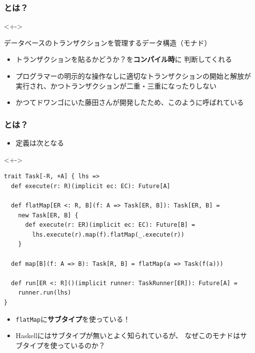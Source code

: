 \begin{frame}
  \frametitle{\Fujitask とは？}

  \pause
  \begin{uncoverenv}<+->
    \begin{block}{\Fujitask}
      データベースのトランザクションを管理するデータ構造（モナド）
    \end{block}
  \end{uncoverenv}

  \begin{itemize}
    \item<+-> トランザクションを貼るかどうか？を\textbf{コンパイル時}に
    判断してくれる

    \item<+-> プログラマーの明示的な操作なしに適切なトランザクションの開始と解放が
    実行され、かつトランザクションが二重・三重になったりしない

    \item<+-> かつてドワンゴにいた藤田さんが開発したため、このように呼ばれている
  \end{itemize}
\end{frame}

\begin{frame}[fragile]
  \frametitle{\Fujitask とは？}

  \begin{itemize}
    \item<+-> 定義は次となる
  \end{itemize}

  \begin{uncoverenv}<+->
\begin{lstlisting}[style=scala]
trait Task[-R, +A] { lhs =>
  def execute(r: R)(implicit ec: EC): Future[A]

  def flatMap[ER <: R, B](f: A => Task[ER, B]): Task[ER, B] =
    new Task[ER, B] {
      def execute(r: ER)(implicit ec: EC): Future[B] =
        lhs.execute(r).map(f).flatMap(_.execute(r))
    }

  def map[B](f: A => B): Task[R, B] = flatMap(a => Task(f(a)))

  def run[ER <: R]()(implicit runner: TaskRunner[ER]): Future[A] =
    runner.run(lhs)
}
\end{lstlisting}
  \end{uncoverenv}

  \begin{itemize}
    \item<+-> \lstinline|flatMap|に\textbf{サブタイプ}を使っている！

    \item<+-> Haskellにはサブタイプが無いとよく知られているが、
    なぜこのモナドはサブタイプを使っているのか？
  \end{itemize}
\end{frame}

